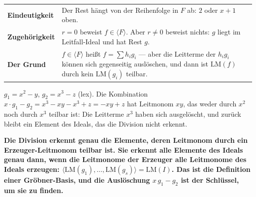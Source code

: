\begin{warnung}
\begin{center}
{\small
\renewcommand{\arraystretch}{1.5}
\begin{tabular}{@{}P{3.4cm}P{5.4cm}@{}}
\toprule
\textbf{Eindeutigkeit} & Der Rest hängt von der Reihenfolge in $F$ ab: $2$ oder $x + 1$ oben.\\
\textbf{Zugehörigkeit} & $r = 0$ beweist $f\in\langle F\rangle$. Aber $r\ne0$ beweist nichts: $g$ liegt im Leitfall-Ideal und hat Rest $g$.\\
\textbf{Der Grund} & $f\in\langle F\rangle$ heißt $f = \sum h_ig_i$ --- aber die Leitterme der $h_ig_i$ können sich gegenseitig auslöschen, und dann ist $\mathrm{LM}(f)$ durch kein $\mathrm{LM}(g_i)$ teilbar.\\
\bottomrule
\end{tabular}}
\end{center}

$g_1 = x^{2} - y$, $g_2 = x^{3} - z$ (lex). Die Kombination $x\cdot g_1 - g_2 = x^{3} - xy - x^{3} + z = -xy + z$ hat Leitmonom $xy$, das weder durch $x^{2}$ noch durch $x^{3}$ teilbar ist: Die Leitterme $x^{3}$ haben sich ausgelöscht, und zurück bleibt ein Element des Ideals, das die Division nicht erkennt.

\begin{center}
\begin{minipage}{0.9\textwidth}
\textbf{Die Division erkennt genau die Elemente, deren Leitmonom durch ein Erzeuger-Leitmonom teilbar ist. Sie erkennt alle Elemente des Ideals genau dann, wenn die Leitmonome der Erzeuger alle Leitmonome des Ideals erzeugen: $\langle\mathrm{LM}(g_1), \ldots, \mathrm{LM}(g_s)\rangle = \mathrm{LM}(I)$. Das ist die Definition einer Gröbner-Basis, und die Auslöschung $x\,g_1 - g_2$ ist der Schlüssel, um sie zu finden.}
\end{minipage}
\end{center}

\begin{center}
\begin{minipage}{0.88\textwidth}
\end{minipage}
\end{center}
\end{warnung}

